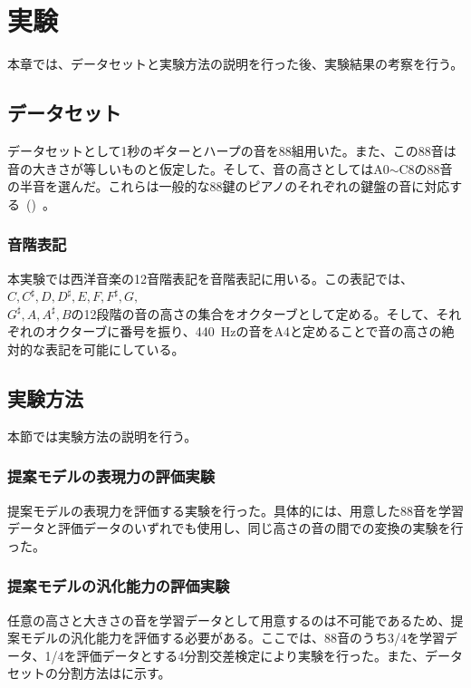 \chapter{実験}

本章では、データセットと実験方法の説明を行った後、実験結果の考察を行う。

\section{データセット}

データセットとして1秒のギターとハープの音を88組用いた。また、この88音は音の大きさが等しいものと仮定した。そして、音の高さとしてはA0$\sim$C8の88音の半音を選んだ。これらは一般的な88鍵のピアノのそれぞれの鍵盤の音に対応する~()~。

\subsection{音階表記}

本実験では西洋音楽の12音階表記を音階表記に用いる。この表記では、$C,C^{\sharp},D,D^{\sharp},E,F,F^{\sharp},G,$\\
$G^{\sharp},A,A^{\sharp},B$の12段階の音の高さの集合をオクターブとして定める。そして、それぞれのオクターブに番号を振り、440~Hzの音をA4と定めることで音の高さの絶対的な表記を可能にしている。

\section{実験方法}

本節では実験方法の説明を行う。

\subsection{提案モデルの表現力の評価実験}

提案モデルの表現力を評価する実験を行った。具体的には、用意した88音を学習データと評価データのいずれでも使用し、同じ高さの音の間での変換の実験を行った。

\subsection{提案モデルの汎化能力の評価実験}

任意の高さと大きさの音を学習データとして用意するのは不可能であるため、提案モデルの汎化能力を評価する必要がある。ここでは、88音のうち3/4を学習データ、1/4を評価データとする4分割交差検定により実験を行った。また、データセットの分割方法はに示す。


